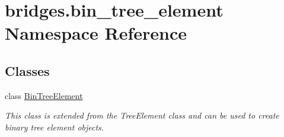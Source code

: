 \hypertarget{namespacebridges_1_1bin__tree__element}{}\section{bridges.\+bin\+\_\+tree\+\_\+element Namespace Reference}
\label{namespacebridges_1_1bin__tree__element}
\subsection*{Classes}
\begin{DoxyCompactItemize}
\item 
class \hyperlink{classbridges_1_1bin__tree__element_1_1_bin_tree_element}{Bin\+Tree\+Element}
\begin{DoxyCompactList}\small\item\em This class is extended from the Tree\+Element class and can be used to create binary tree element objects. \end{DoxyCompactList}\end{DoxyCompactItemize}
